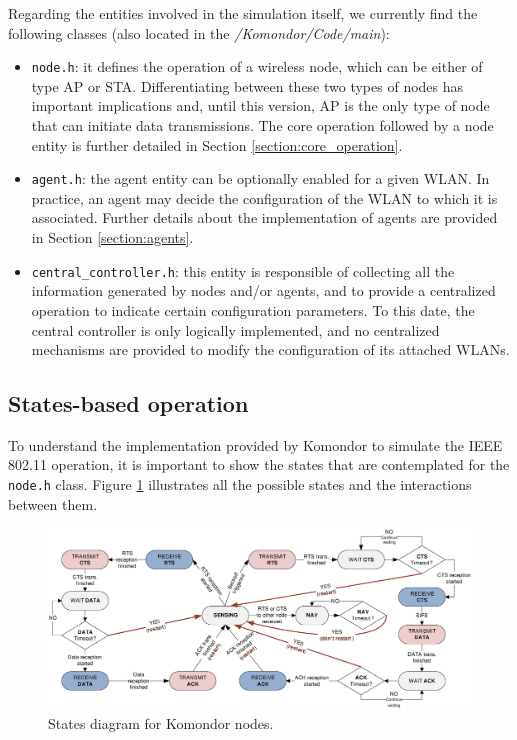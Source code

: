 \documentclass[a4paper]{article}
\begin{document}
Regarding the entities involved in the simulation itself, we currently find the following classes (also located in the \textit{/Komondor/Code/main}):
\begin{itemize}
	\item \texttt{node.h}: it defines the operation of a wireless node, which can be either of type AP or STA. Differentiating between these two types of nodes has important implications and, until this version, AP is the only type of node that can initiate data transmissions. The core operation followed by a node entity is further detailed in Section \ref{section:core_operation}.
	\item \texttt{agent.h}: the agent entity can be optionally enabled for a given WLAN. In practice, an agent may decide the configuration of the WLAN to which it is associated. Further details about the implementation of agents are provided in Section \ref{section:agents}.
	\item \texttt{central\_controller.h}: this entity is responsible of collecting all the information generated by nodes and/or agents, and to provide a centralized operation to indicate certain configuration parameters. To this date, the central controller is only logically implemented, and no centralized mechanisms are provided to modify the configuration of its attached WLANs.
\end{itemize}

\subsection{States-based operation}
\label{section:states}
To understand the implementation provided by Komondor to simulate the IEEE 802.11 operation, it is important to show the states that are contemplated for the \texttt{node.h} class. Figure \ref{fig:state_diagram} illustrates all the possible states and the interactions between them.

\begin{figure}[h]
	\centering
	\includegraphics[width=\textwidth]{images/state_diagram.eps}
	\caption{States diagram for Komondor nodes.}    
	\label{fig:state_diagram}
\end{figure}
\end{document}
